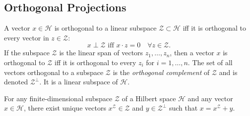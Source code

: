 \documentclass[\topdir/lecture\_notes.tex]{subfiles}
\begin{document}
\subsection{Orthogonal Projections}
A vector $x \in \mathcal{H}$ is orthogonal to a linear subspace $\mathcal{Z} \subset \mathcal{H}$ iff it is orthogonal to every vector in $z \in \mathcal{Z}$:
\begin{equation*}
x \perp \mathcal{Z} \text { iff } x \cdot z=0 \quad \forall z \in \mathcal{Z}. 
\end{equation*}
If the subspace $\mathcal{Z}$ is the linear span of vectors $z_{1}, \ldots, z_{n}$, then a vector $x$ is orthogonal to $\mathcal{Z}$ iff it is orthogonal to every $z_{i}$ for $i=1, \ldots, n$. The set of all vectors orthogonal to a subspace $\mathcal{Z}$ is the \emph{orthogonal complement} of $\mathcal{Z}$ and is denoted $\mathcal{Z}^{\perp}$. It is a linear subspace of $\mathcal{H}$.
\begin{theorem}\label{thm:orthogonal_projection}
For any finite-dimensional subspace $\mathcal{Z}$ of a Hilbert space $\mathcal{H}$ and any vector $x \in \mathcal{H}$, there exist unique vectors $x^{\mathcal{Z}} \in \mathcal{Z}$ and $y \in \mathcal{Z}^{\perp}$ such that $x=x^{\mathcal{Z}}+y$.
\end{theorem}
\end{document}

